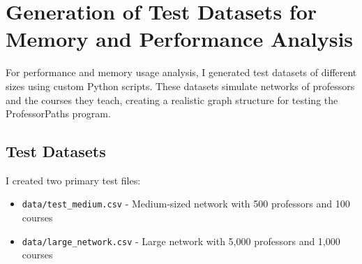 \documentclass[11pt]{article}
\begin{document}
\section*{Generation of Test Datasets for Memory and Performance Analysis}

For performance and memory usage analysis, I generated test datasets of different sizes using custom Python scripts. These datasets simulate networks of professors and the courses they teach, creating a realistic graph structure for testing the ProfessorPaths program.

\subsection*{Test Datasets}
I created two primary test files:
\begin{itemize}
    \item \texttt{data/test\_medium.csv} - Medium-sized network with 500 professors and 100 courses
    \item \texttt{data/large\_network.csv} - Large network with 5,000 professors and 1,000 courses
\end{itemize}
\end{document}
